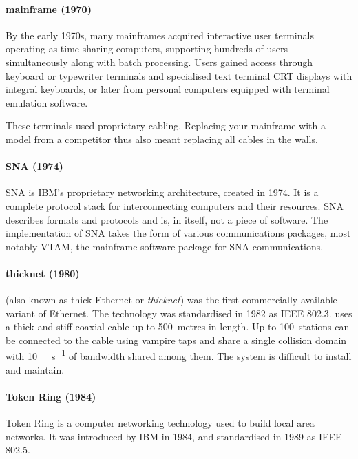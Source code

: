 {\paragraph{mainframe (1970)}
By the early 1970s, many mainframes acquired interactive user terminals operating as time-sharing computers, supporting hundreds of users simultaneously along with batch processing.
Users gained access through keyboard or typewriter terminals and specialised text terminal \gls{CRT} displays with integral keyboards, or later from personal computers equipped with terminal emulation software.

These terminals used proprietary cabling.
Replacing your mainframe with a model from a competitor thus also meant replacing all cables in the walls.
    
\paragraph{\acl{SNA} (1974)}
\Gls{SNA} is IBM's proprietary networking architecture, created in 1974.
It is a complete protocol stack for interconnecting computers and their resources.
\gls{SNA} describes formats and protocols and is, in itself, not a piece of software.
The implementation of \gls{SNA} takes the form of various communications packages, most notably \gls{VTAM}, the mainframe software package for \gls{SNA} communications.
    
\paragraph{thicknet (1980)}
 (also known as thick Ethernet or \emph{thicknet}) was the first commercially available variant of Ethernet.
The technology was standardised in 1982 as \acs{IEEE} 802.3.
 uses a thick and stiff coaxial cable up to 500~metres in length.
Up to 100~stations can be connected to the cable using vampire taps and share a single collision domain with \SI{10}{\mega\bit\per\second} of bandwidth shared among them.
The system is difficult to install and maintain.

\paragraph{Token Ring (1984)}
Token Ring is a computer networking technology used to build local area networks.
It was introduced by IBM in 1984, and standardised in 1989 as \acs{IEEE} 802.5.

}
